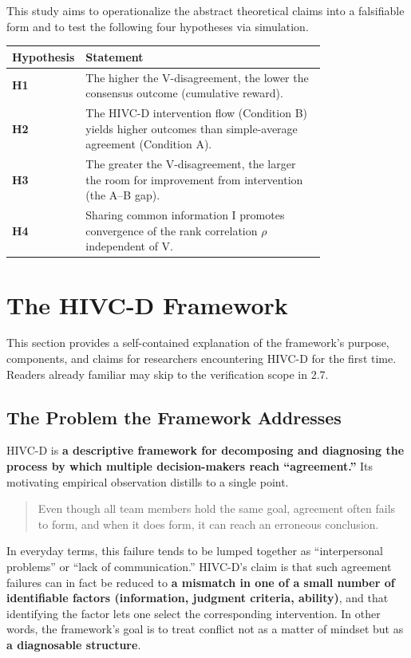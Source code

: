 \documentclass[11pt]{article}
\begin{document}
This study aims to operationalize the abstract theoretical claims into a falsifiable form and to test the following four hypotheses via simulation.

\begin{longtable}{@{}l p{0.78\linewidth}@{}}
\toprule
Hypothesis & Statement \\
\midrule
\textbf{H1} & The higher the V-disagreement, the lower the consensus outcome (cumulative reward). \\
\textbf{H2} & The HIVC-D intervention flow (Condition B) yields higher outcomes than simple-average agreement (Condition A). \\
\textbf{H3} & The greater the V-disagreement, the larger the room for improvement from intervention (the A--B gap). \\
\textbf{H4} & Sharing common information I promotes convergence of the rank correlation $\rho$ independent of V. \\
\bottomrule
\end{longtable}

\section{The HIVC-D Framework}

This section provides a self-contained explanation of the framework's purpose, components, and claims for researchers encountering HIVC-D for the first time. Readers already familiar may skip to the verification scope in 2.7.

\subsection{The Problem the Framework Addresses}

HIVC-D is \textbf{a descriptive framework for decomposing and diagnosing the process by which multiple decision-makers reach ``agreement.''} Its motivating empirical observation distills to a single point.

\begin{quote}
Even though all team members hold the same goal, agreement often fails to form, and when it does form, it can reach an erroneous conclusion.
\end{quote}

In everyday terms, this failure tends to be lumped together as ``interpersonal problems'' or ``lack of communication.'' HIVC-D's claim is that such agreement failures can in fact be reduced to \textbf{a mismatch in one of a small number of identifiable factors (information, judgment criteria, ability)}, and that identifying the factor lets one select the corresponding intervention. In other words, the framework's goal is to treat conflict not as a matter of mindset but as \textbf{a diagnosable structure}.
\end{document}

